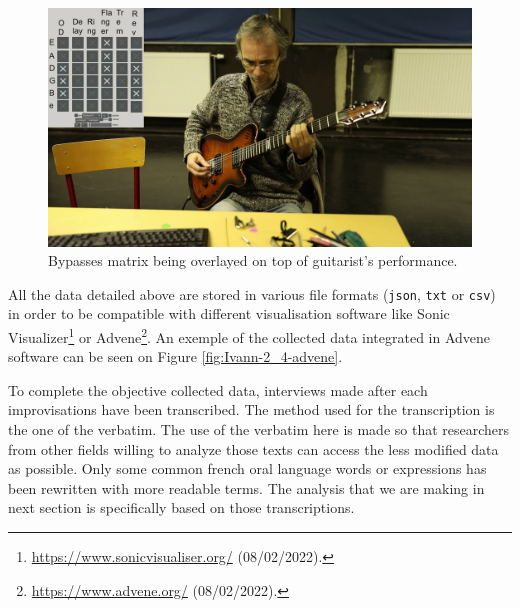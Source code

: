 \documentclass{article}
\begin{document}
\begin{figure}
    \centering
    \includegraphics[width=0.9\columnwidth]{figures/Raphael-2_5-rec-impro_01-screenshot-00_05_30_800}
    \caption{Bypasses matrix being overlayed on top of guitarist's performance.}
    \label{fig:overlay}
\end{figure}

All the data detailed above are stored in various file formats (\texttt{json}, \texttt{txt} or \texttt{csv}) in order to be compatible with different visualisation software like Sonic Visualizer\footnote{\url{https://www.sonicvisualiser.org/} (08/02/2022).} or Advene\footnote{\url{https://www.advene.org/} (08/02/2022).}. An exemple of the collected data integrated in Advene software can be seen on Figure \ref{fig:Ivann-2_4-advene}. %

To complete the objective collected data, interviews made after each improvisations have been transcribed.  The method used for the transcription is the one of the verbatim. The use of the verbatim here is made so that researchers from other fields willing to analyze those texts can access the less modified data as possible. Only some common french oral language words or expressions has been rewritten with more readable terms. The analysis that we are making in next section is specifically based on those transcriptions. 



\end{document}
